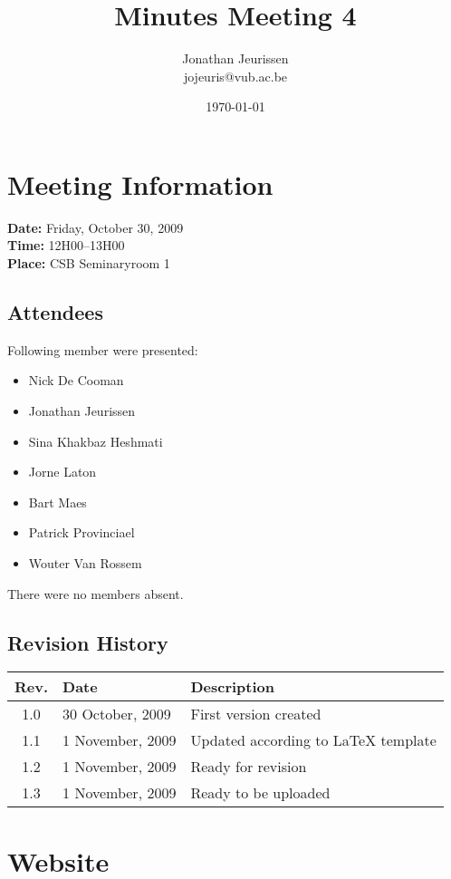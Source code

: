 \documentclass[a4paper, 12pt]{article}
\begin{document}
\title{Minutes Meeting 4}
\author{Jonathan Jeurissen \\ jojeuris@vub.ac.be}
\date{\today}

\maketitle	
	\section{Meeting Information}
			\textbf{Date:} Friday, October 30, 2009\\
			\textbf{Time:} 12H00--13H00\\
			\textbf{Place:} CSB Seminaryroom 1\\
		\subsection{Attendees}
Following member were presented:
			\begin{itemize}
				\item Nick De Cooman
				\item Jonathan Jeurissen
				\item Sina Khakbaz Heshmati
				\item Jorne Laton
				\item Bart Maes
				\item Patrick Provinciael
				\item Wouter Van Rossem
			\end{itemize}
There were no members absent.
		\subsection{Revision History}
			\begin{tabular}{c | l | l }
				\textbf{Rev.} & \textbf{Date} & \textbf{Description} \\
				\hline
				1.0 & 30 October, 2009 & First version created \\
				1.1 & 1 November, 2009 & Updated according to \LaTeX{} template \\
				1.2 & 1 November, 2009 & Ready for revision \\
				1.3 & 1 November, 2009 & Ready to be uploaded \\
			\end{tabular}		
	
	\section{Website}
	
\end{document}
